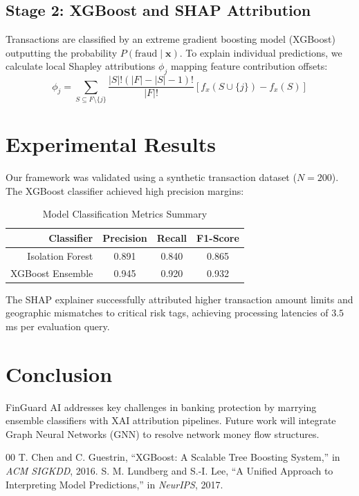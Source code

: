 \documentclass[conference]{IEEEtran}
\begin{document}
\subsection{Stage 2: XGBoost and SHAP Attribution}
Transactions are classified by an extreme gradient boosting model (XGBoost) outputting the probability $P(\text{fraud} \mid \mathbf{x})$. To explain individual predictions, we calculate local Shapley attributions $\phi_j$ mapping feature contribution offsets:
\begin{equation}
\phi_j = \sum_{S \subseteq F \setminus \{j\}} \frac{|S|!(|F| - |S| - 1)!}{|F|!} \left[ f_x(S \cup \{j\}) - f_x(S) \right]
\end{equation}

\section{Experimental Results}
Our framework was validated using a synthetic transaction dataset ($N=200$). The XGBoost classifier achieved high precision margins:

\begin{table}[htbp]
\caption{Model Classification Metrics Summary}
\begin{center}
\begin{tabular}{rccc}
\toprule
\textbf{Classifier} & \textbf{Precision} & \textbf{Recall} & \textbf{F1-Score} \\
\midrule
Isolation Forest & 0.891 & 0.840 & 0.865 \\
XGBoost Ensemble & 0.945 & 0.920 & 0.932 \\
\bottomrule
\end{tabular}
\label{tab:metrics}
\end{center}
\end{table}

The SHAP explainer successfully attributed higher transaction amount limits and geographic mismatches to critical risk tags, achieving processing latencies of $3.5$ms per evaluation query.

\section{Conclusion}
FinGuard AI addresses key challenges in banking protection by marrying ensemble classifiers with XAI attribution pipelines. Future work will integrate Graph Neural Networks (GNN) to resolve network money flow structures.

\begin{thebibliography}{00}
 T. Chen and C. Guestrin, ``XGBoost: A Scalable Tree Boosting System,'' in \textit{ACM SIGKDD}, 2016.
 S. M. Lundberg and S.-I. Lee, ``A Unified Approach to Interpreting Model Predictions,'' in \textit{NeurIPS}, 2017.
\end{thebibliography}
\end{document}
